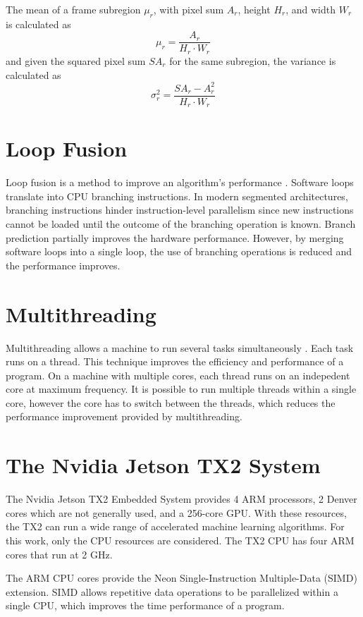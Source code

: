 The mean of a frame subregion $\mu_r$, with pixel sum $A_r$, height $H_r$, and width $W_r$ is calculated as
%
\begin{equation}
  \label{eq:mu_r}
  \mu_r = \frac{A_r}{H_r\cdot W_r}
\end{equation}
%
and given the squared pixel sum $SA_r$ for the same subregion, the variance is calculated as
%
\begin{equation}
  \label{eq:var_r}
  \sigma^2_r = \frac{SA_r - A^2_r}{H_r\cdot W_r}
\end{equation}
%

\section{Loop Fusion}
\label{sec:loop_unrolling}

Loop fusion is a method to improve an algorithm's performance \cite{Kennedy1994}. Software loops translate into CPU branching instructions. In modern segmented architectures, branching instructions hinder instruction-level parallelism since new instructions cannot be loaded until the outcome of the branching operation is known. Branch prediction partially improves the hardware performance. However, by merging software loops into a single loop, the use of branching operations is reduced and the performance improves.

\section{Multithreading}
\label{sec:teo_multithreading}

Multithreading allows a machine to run several tasks simultaneously \cite{Saavedra1990}. Each task runs on a thread. This technique improves the efficiency and performance of a program. On a machine with multiple cores, each thread runs on an indepedent core at maximum frequency. It is possible to run multiple threads within a single core, however the core has to switch between the threads, which reduces the performance improvement provided by multithreading.

\section{The Nvidia Jetson TX2 System}
\label{sec:tx2_simd}

The Nvidia Jetson TX2 Embedded System \cite{tx2} provides 4 ARM processors, 2 Denver cores which are not generally used, and a 256-core GPU. With these resources, the TX2 can run a wide range of accelerated machine learning algorithms. For this work, only the CPU resources are considered. The TX2 CPU has four ARM cores that run at 2 GHz.

The ARM CPU cores provide the Neon Single-Instruction Multiple-Data (SIMD) extension. SIMD allows repetitive data operations to be parallelized within a single CPU, which improves the time performance of a program.
